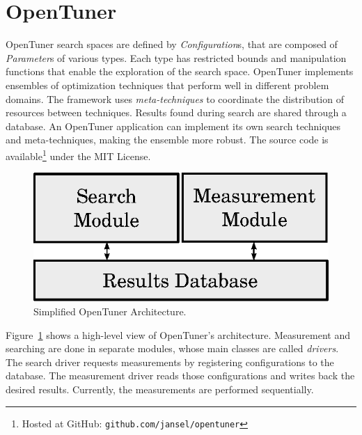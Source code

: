 \documentclass[12pt]{article}
\begin{document}

\section{OpenTuner} \label{sec:ot}

OpenTuner search spaces are defined by \emph{Configuration}s, that are composed
of \emph{Parameter}s of various types. Each type has restricted bounds and
manipulation functions that enable the exploration of the search space.
OpenTuner implements ensembles of optimization techniques that
perform well in different problem domains. The framework uses
\emph{meta-techniques} to coordinate the distribution of resources
between techniques.
Results found during search are shared through a
database. An OpenTuner application can implement its own search
techniques and meta-techniques, making the ensemble more robust.
The source code is available\footnote{Hosted at GitHub:
\texttt{\scriptsize github.com/jansel/opentuner}} under the MIT License.

\begin{figure}[htpb]
    \centering
    \includegraphics[scale=.62]{opentuner-implementation}
    \caption{Simplified OpenTuner Architecture.}
    \label{fig:ot-imp}
\end{figure}

Figure~\ref{fig:ot-imp} shows a high-level view of OpenTuner's architecture.
Measurement and searching are done in separate modules, whose main classes are
called \emph{drivers}. The search driver requests measurements by registering
configurations to the database. The measurement driver reads those
configurations and writes back the desired results.  Currently, the
measurements are performed sequentially.
\end{document}

